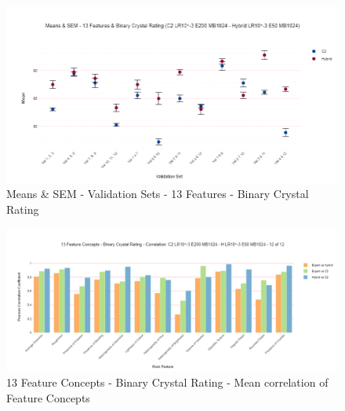 \begin{figure}[H]
  \centering
    \includegraphics[width=\textwidth]{images/Means & SEM - 13 Features & Binary Crystal Rating (C2 LR10^-3 E200 MB1024 - Hybrid LR10^-3 E50 MB1024).png}
    \caption{Means \& SEM - Validation Sets - 13 Features - Binary Crystal Rating} \label{fig:Means & SEM - Validation Sets - 13 Features - Binary Crystal Rating}
\end{figure}


\begin{figure}[H]
  \centering
    \includegraphics[width=\textwidth]{images/13 Feature Concepts - Binary Crystal Rating - Correlation- C2 LR10^-3 E200 MB1024 - H LR10^-3 E50 MB1024 - 12 of 12.png}
    \caption{13 Feature Concepts - Binary Crystal Rating - Mean correlation of Feature Concepts} \label{fig:13 Feature Concepts - Binary Crystal Rating - Mean correlation of Feature Concepts}
\end{figure}


